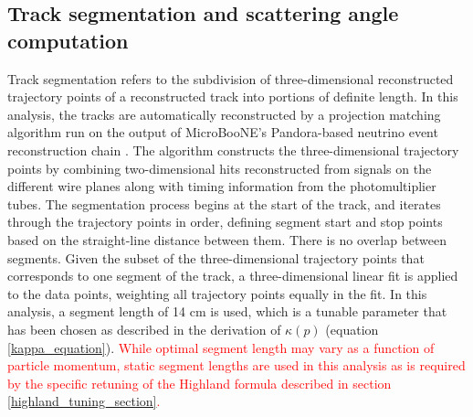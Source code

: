 \documentclass[a4paper,11pt]{article}
\begin{document}
\subsection{Track segmentation and scattering angle computation}\label{track_segmentation_and_scattering_angle_computation_section}

Track segmentation refers to the subdivision of three-dimensional reconstructed trajectory points of a reconstructed track into portions of definite length. In this analysis, the tracks are automatically reconstructed by a projection matching algorithm \cite{Antonello:2012hu} run on the output of MicroBooNE's Pandora-based neutrino event reconstruction chain \cite{Marshall:2015rfa}. The algorithm constructs the three-dimensional trajectory points by combining two-dimensional hits reconstructed from signals on the different wire planes along with timing information from the photomultiplier tubes. The segmentation process begins at the start of the track, and iterates through the trajectory points in order, defining segment start and stop points based on the straight-line distance between them. There is no overlap between segments. Given the subset of the three-dimensional trajectory points that corresponds to one segment of the track, a three-dimensional linear fit is applied to the data points, weighting all trajectory points equally in the fit. In this analysis, a segment length of 14 cm is used, which is a tunable parameter that has been chosen as described in the derivation of $\kappa(p)$ (equation \ref{kappa_equation}). \textcolor{red}{While optimal segment length may vary as a function of particle momentum, static segment lengths are used in this analysis as is required by the specific retuning of the Highland formula described in section \ref{highland_tuning_section}.}\\
\end{document}
